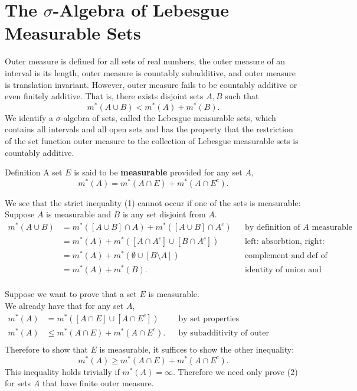 


\section{The $\sigma$-Algebra of Lebesgue Measurable Sets}
\begin{flushleft}
	Outer measure is defined for all sets of real numbers, the outer measure of an interval is its length, outer measure is countably subadditive, and outer measure is translation invariant.
	However, outer measure fails to be countably additive or even finitely additive.
	That is, there exists disjoint sets $A,B$ such that 
	\begin{equation}
		m^*(A\cup B)<m^*(A)+m^*(B).\tag{1}	
	\end{equation}
	We identify a $\sigma$-algebra of sets, called the Lebesgue measurable sets, which contains all intervals and all open sets and has the property that the restriction of the set function outer measure to the collection of Lebesgue measurable sets is countably additive.
	\begin{namedthm*}{Definition}
		A set $E$ is said to be \textbf{measurable} provided for any set $A$,
		\[
			m^*(A)=m^*(A\cap E)+m^*(A\cap E^c).	
		\]		
	\end{namedthm*}  
	We see that the strict inequality (1) cannot occur if one of the sets is measurable:\\
	Suppose $A$ is measurable and $B$ is any set disjoint from $A$.
	\begin{align*}
		m^*(A\cup B)&=m^*([A\cup B]\cap A)+m^*([A\cup B]\cap A^c)&&\text{by definition of $A$ measurable}\\
		&=m^*(A)+m^*([A\cap A^c]\cup [B\cap A^c])&&\text{left: absorbtion, right: distributive property}\\
		&=m^*(A)+m^*(\emptyset\cup [B\setminus A])&&\text{complement and def of set difference}\\
		&=m^*(A)+m^*(B).&&\text{identity of union and set difference of disjoint sets}\\
	\end{align*}
	
	Suppose we want to prove that a set $E$ is measurable.\\
	We already have that for any set $A$,
	\begin{align*}
		m^*(A)&=m^*([A\cap E]\cup[A\cap E^c])&&\text{by set properties}\\
		m^*(A)&\le m^*(A\cap E)+m^*(A\cap E^c).&&\text{by subadditivity of outer measure}\\
	\end{align*}
	Therefore to show that $E$ is measurable, it suffices to show the other inequality:
	\begin{equation}
		m^*(A)\ge m^*(A\cap E)+m^*(A\cap E^c).\tag{2}
	\end{equation}
	This inequality holds trivially if $m^*(A)=\infty$. Therefore we need only prove (2) for sets $A$ that have finite outer measure.


\end{flushleft}
